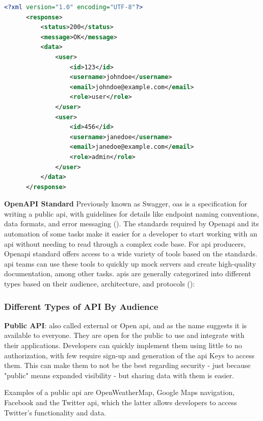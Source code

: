\begin{lstlisting}[language=XML, caption=Example of a XML response, label=lst:xmlresponse]
      <?xml version="1.0" encoding="UTF-8"?>
      <response>
          <status>200</status>
          <message>OK</message>
          <data>
              <user>
                  <id>123</id>
                  <username>johndoe</username>
                  <email>johndoe@example.com</email>
                  <role>user</role>
              </user>
              <user>
                  <id>456</id>
                  <username>janedoe</username>
                  <email>janedoe@example.com</email>
                  <role>admin</role>
              </user>
          </data>
      </response>
\end{lstlisting}

\begin{multicols}{2}
      \textbf{OpenAPI Standard}
      Previously known as Swagger, \acrshort{oas} is a specification for writing a public \acrshort{api}, with
      guidelines for details like endpoint naming conventions, data formats, and error messaging
      (\cite{openapistandard}). The standards required by Open\acrshort{api} and its automation of some tasks
      make it easier for a developer to start working with an \acrshort{api} without needing to read through
      a complex code base. For \acrshort{api} producers, Open\acrshort{api} standard offers access to a wide
      variety of tools based on the standards. \acrshort{api} teams can use these tools to quickly up mock
      servers and create high-quality documentation, among other tasks.
      \acrshort{api}s are generally categorized into different types based on their audience, architecture, and
      protocols (\cite{typesofapi}):
      \subsubsection{Different Types of API By Audience}
      \textbf{Public API}: also called external or Open \acrshort{api}, and as the name suggests it is available
      to everyone. They are open for the public to use and integrate with their applications. Developers can quickly
      implement them using little to no authorization, with few require sign-up and generation of the \acrshort{api} Keys
      to access them. This can make them to not be the best regarding security - just because "public" means expanded
      visibility - but sharing data with them is easier.

      Examples of a public \acrshort{api} are OpenWeatherMap, Google Maps navigation, Facebook and the Twitter \acrshort{api},
      which the latter allows  developers to access Twitter's functionality and data.


\end{multicols}
